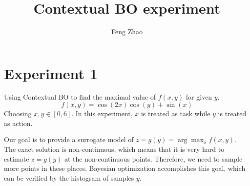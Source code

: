 \documentclass{article}
\title{Contextual BO experiment}
\author{Feng Zhao}
\begin{document}
\maketitle
\section{Experiment 1}
Using Contextual BO to find the maximal value of $f(x,y)$ for given $y$.
\begin{equation}\label{eq:f}
    f(x,y) = \cos(2 x) \cos(y) + \sin(x)
\end{equation}
Choosing $x,y \in [0,6]$.
In this experiment, $x$ is treated as task while $y$ is treated
as action.

Our goal is to provide a surrogate model of $z=g(y)=\arg\max_{x} f(x,y)$.
The exact solution is non-continuous, which means that it is very hard to estimate $z=g(y)$ at the
non-continuous points. Therefore, we need to sample more points in these places.
Bayesian optimization accomplishes this goal,
which can be verified by the histogram of samples $y$.
\end{document}
